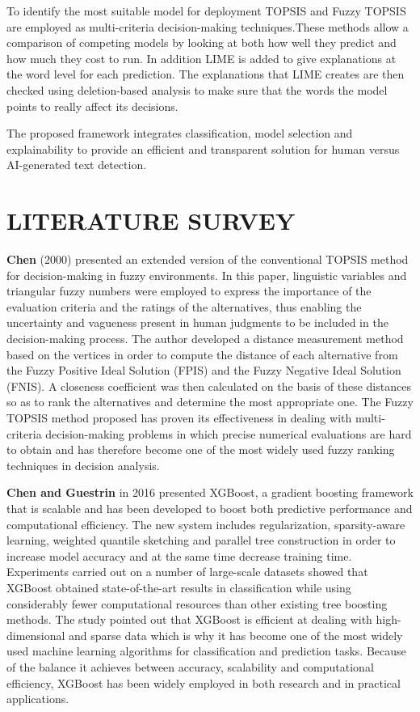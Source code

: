 \documentclass[conference]{IEEEtran}
\begin{document}
To identify the most suitable model for deployment TOPSIS and Fuzzy TOPSIS are employed as multi-criteria decision-making techniques.These methods allow a comparison of competing models by looking at both how well they predict and how much they cost to run.
In addition LIME is added to give explanations at the word level for each prediction. The explanations that LIME creates are then checked using deletion-based analysis to make sure that the words the model points to really affect its decisions.

The proposed framework integrates classification, model selection and explainability to provide an efficient and transparent solution for human versus AI-generated text detection.




\section{LITERATURE SURVEY}

\textbf{Chen} (2000) presented an extended version of the conventional TOPSIS method for decision-making in fuzzy environments. In this paper, linguistic variables and triangular fuzzy numbers were employed to express the importance of the evaluation criteria and the ratings of the alternatives, thus enabling the uncertainty and vagueness present in human judgments to be included in the decision-making process. The author developed a distance measurement method based on the vertices in order to compute the distance of each alternative from the Fuzzy Positive Ideal Solution (FPIS) and the Fuzzy Negative Ideal Solution (FNIS). A closeness coefficient was then calculated on the basis of these distances so as to rank the alternatives and determine the most appropriate one. The Fuzzy TOPSIS method proposed has proven its effectiveness in dealing with multi-criteria decision-making problems in which precise numerical evaluations are hard to obtain and has therefore become one of the most widely used fuzzy ranking techniques in decision analysis.

\textbf{Chen and Guestrin } in 2016 presented XGBoost, a gradient boosting framework that is scalable and has been developed to boost both predictive performance and computational efficiency. The new system includes regularization, sparsity-aware learning, weighted quantile sketching and parallel tree construction in order to increase model accuracy and at the same time decrease training time. Experiments carried out on a number of large-scale datasets showed that XGBoost obtained state-of-the-art results in classification while using considerably fewer computational resources than other existing tree boosting methods. The study pointed out that XGBoost is efficient at dealing with high-dimensional and sparse data which is why it has become one of the most widely used machine learning algorithms for classification and prediction tasks. Because of the balance it achieves between accuracy, scalability and computational efficiency, XGBoost has been widely employed in both research and in practical applications.
\end{document}
